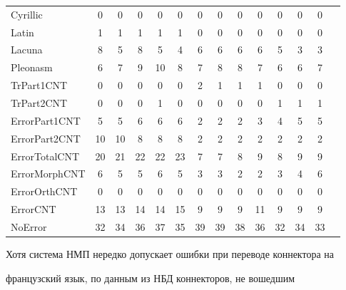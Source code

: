 \begin{table}
\begin{center}
\begin{tabular}{|l|c|c|c|c|c|c|c|c|c|c|c|c|c|}
Cyrillic&0&0&0&0&0&0&0&0&0&0&0&0\\


Latin&1&1&1&1&1&0&0&0&0&0&0&0\\


Lacuna&8&5&8&5&4&6&6&6&6&5&3&3\\


Pleonasm&6&7&9&10\hphantom{9}&8&7&8&8&7&6&6&7\\


TrPart1CNT&0&0&0&0&0&2&1&1&1&0&0&0\\


TrPart2CNT&0&0&0&1&0&0&0&0&0&1&1&1\\


ErrorPart1CNT&5&5&6&6&6&2&2&2&3&4&5&5\\


ErrorPart2CNT&10\hphantom{9}&10\hphantom{9}&8&8&8&2&2&2&2&2&2&2\\


ErrorTotalCNT&20\hphantom{9}&21\hphantom{9}&22\hphantom{9}&22\hphantom{9}


&23\hphantom{9}&7&7&8&9&8&9&9\\


ErrorMorphCNT&6&5&5&6&5&3&3&2&2&3&4&6\\


ErrorOrthCNT&0&0&0&0&0&0&0&0&0&0&0&0\\


ErrorCNT&13\hphantom{9}&13\hphantom{9}&14\hphantom{9}&14\hphantom{9}


&15\hphantom{9}&9&9&9&11\hphantom{9}&9&9&9\\


NoError&32\hphantom{9}&34\hphantom{9}&36\hphantom{9}&37\hphantom{9}&


35\hphantom{9}&39\hphantom{9}&39\hphantom{9}&38\hphantom{9}&36\hphantom{9}


&32\hphantom{9}&34\hphantom{9}&33\hphantom{9}\\


\hline


\end{tabular}


\end{center}


\end{table}





  Хотя система НМП нередко допускает ошибки при переводе коннектора на 


французский язык, по данным из НБД коннекторов, не вошедшим 


